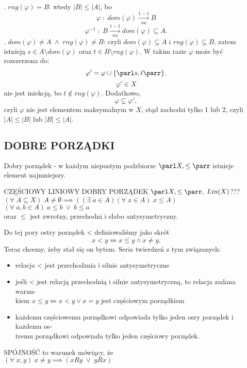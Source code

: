 . {\color{emp}$rng(\varphi)=B$:} wtedy $|B|\leq |A|$, bo
$$\varphi\;:\;dom(\varphi)\xrightarrow[na]{1-1} B$$
$$\varphi^{-1}\;:\;B\xrightarrow[na]{1-1} dom(\varphi)\subseteq A.$$
. {\color{emp}$dom(\varphi)\neq A\;\land\;rng(\varphi)\neq B$:} czyli $dom(\varphi)\subsetneq A$ i $rng(\varphi)\subsetneq B$, zatem istnieją $s\in A\setminus dom(\varphi)$ oraz $t\in B\setminus rng(\varphi)$. W takim razie $\varphi$ może być rozszerzona do:
$$\varphi'=\varphi\cup\{\parl s,t\parr\}.$$
$$\varphi'\in X$$ nie jest iniekcją, bo $t\notin rng(\varphi)$. Dodatkowo,
$$\varphi\subsetneq \varphi',$$
czyli $\varphi$ nie jest elementem maksymalnym w $X$, stąd {\color{emp}zachodzi tylko 1 lub 2}, czyli $|A|\leq |B|$ lub $|B|\leq |A|$.
\kondow

\subsection{DOBRE PORZĄDKI}
{\color{acc}Dobry porządek }- w każdym niepustym podzbiorze $\parl X, \leq\parr$ istnieje element najmniejszy.
\begin{center}\large
    {\color{def}CZĘŚCIOWY LINIOWY DOBRY PORZĄDEK} $\parl X,\leq\parr,\;Lin(X)$???\smallskip\\
    $(\forall\;A\subseteq X)\;A\neq\emptyset\implies ((\exists\;a\in A)(\forall\;x\in A)\;x\leq A)$\smallskip\\
    $(\forall\;a,b\in A)\;a\leq b\;\lor\;b\leq a$\smallskip\\
    oraz $\leq$ jest zwrotny, przechodni i słabo antysymetryczny.
\end{center}\bigskip
Do tej pory ostry porządek < definiowaliśmy jako skrót
$$x<y\iff x\leq y\land x\neq y.$$
Teraz chcemy, żeby stał się on bytem. Seria twierdzeń z tym związanych:\medskip
\begin{itemize}
    \item relacja < jest przechodznia i silnie antysymetryczne
    \item jeśli < jest relacją przechodnią i silnie antysymetryczną, to relacja zadana warun-\\kiem $x\leq y \iff x< y\lor x=y$ jest częściowym porządkiem
    \item każdemu częściowemu porządkowi odpowiada tylko jeden osry porządek i każdemu os-\\tremu porządkowi odpowiada tylko jeden częściowy porządek.
\end{itemize}
\begin{center}
    {\color{def}SPÓJNOŚĆ} to warunek mówiący, że\smallskip\\
    $(\forall\;x,y)\;x\neq y\implies (xRy\;\lor\; yRx)$
\end{center}\bigskip

